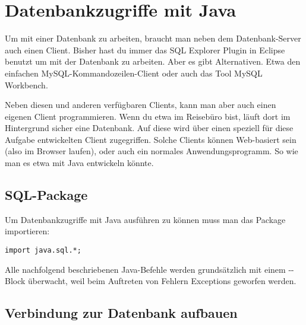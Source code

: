 \chapter{Datenbankzugriffe mit Java}
\renewcommand{\chaptertitle}{Datenbankzugriffe mit Java}

\lehead[]{\normalfont\sffamily\hspace*{-2.00cm}\textcolor{white}{\colorbox{lightblue}{\makebox[1.60cm][r]{\thechapter}}}\hspace{0.17cm}\textcolor{lightblue}{\chaptertitle}}
\rohead[]{\textcolor{lightblue}{\chaptertitle}\normalfont\sffamily\hspace*{0.17cm}\textcolor{white}{\colorbox{lightblue}{\makebox[1.60cm][l]{\thechapter}}}\hspace{-2.00cm}}
\rehead[]{\textcolor{lightblue}{AvHG, Inf, My}}
\lohead[]{\textcolor{lightblue}{AvHG, Inf, My}}

\lstset{style=myJava}

Um mit einer Datenbank zu arbeiten, braucht man neben dem Datenbank-Server auch
einen Client. Bisher hast du immer das SQL Explorer Plugin in Eclipse benutzt um 
mit der Datenbank zu arbeiten. Aber es gibt Alternativen. Etwa den einfachen
MySQL-Kommandozeilen-Client oder auch das Tool MySQL Workbench.

Neben diesen und anderen verfügbaren Clients, kann man aber auch einen eigenen
Client programmieren. Wenn du etwa im Reisebüro bist, läuft dort im Hintergrund
sicher eine Datenbank. Auf diese wird über einen speziell für diese Aufgabe
entwickelten Client zugegriffen. Solche Clients können Web-basiert sein (also
im Browser laufen), oder auch ein normales Anwendungsprogramm. So wie man es
etwa mit Java entwickeln könnte.

\section{SQL-Package}

Um Datenbankzugriffe mit Java ausführen zu können muss man das Package
 importieren:

\begin{lstlisting}
import java.sql.*;
\end{lstlisting}

Alle nachfolgend beschriebenen Java-Befehle werden grundsätzlich mit einem
--Block überwacht, weil beim Auftreten von Fehlern
Exceptions geworfen werden.

\section{Verbindung zur Datenbank aufbauen}

